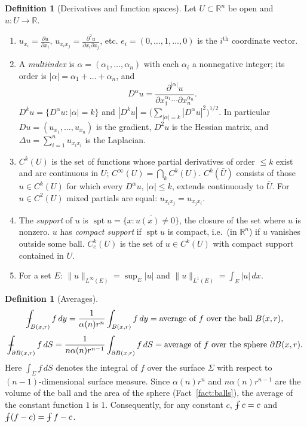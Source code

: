 \documentclass[11pt]{article}
\def\Xint#1{\mathchoice
  {\XXint\displaystyle\textstyle{#1}}%
  {\XXint\textstyle\scriptstyle{#1}}%
  {\XXint\scriptstyle\scriptscriptstyle{#1}}%
  {\XXint\scriptscriptstyle\scriptscriptstyle{#1}}%
  \!\int}
\def\XXint#1#2#3{{\setbox0=\hbox{$#1{#2#3}{\int}$}
  \vcenter{\hbox{$#2#3$}}\kern-.5\wd0}}
\def\fint{\Xint-}
\theoremstyle{plain}
\theoremstyle{definition}
\newtheorem{definition}[theorem]{Definition}
\theoremstyle{remark}
\begin{document}
\begin{definition}[Derivatives and function spaces]\label{def:derivatives}
Let $U \subset \mathbb{R}^n$ be open and $u : U \to \mathbb{R}$.
\begin{enumerate}
    \item $u_{x_i} = \frac{\partial u}{\partial x_i}$, $u_{x_i x_j} = \frac{\partial^2 u}{\partial x_i \partial x_j}$, etc. $e_i = (0,\dots,1,\dots,0)$ is the $i^{\text{th}}$ coordinate vector.
    \item A \emph{multiindex} is $\alpha = (\alpha_1, \dots, \alpha_n)$ with each $\alpha_i$ a nonnegative integer; its order is $|\alpha| = \alpha_1 + \dots + \alpha_n$, and
    $$ D^\alpha u = \frac{\partial^{|\alpha|} u}{\partial x_1^{\alpha_1} \cdots \partial x_n^{\alpha_n}}. $$
    $D^k u = \{ D^\alpha u : |\alpha| = k \}$ and $|D^k u| = \big( \sum_{|\alpha| = k} |D^\alpha u|^2 \big)^{1/2}$. In particular $Du = (u_{x_1}, \dots, u_{x_n})$ is the gradient, $D^2 u$ is the Hessian matrix, and $\Delta u = \sum_{i=1}^n u_{x_i x_i}$ is the Laplacian.
    \item $C^k(U)$ is the set of functions whose partial derivatives of order $\leq k$ exist and are continuous in $U$; $C^\infty(U) = \bigcap_k C^k(U)$. $C^k(\bar U)$ consists of those $u \in C^k(U)$ for which every $D^\alpha u$, $|\alpha| \le k$, extends continuously to $\bar U$. For $u \in C^2(U)$ mixed partials are equal: $u_{x_i x_j} = u_{x_j x_i}$.
    \item The \emph{support} of $u$ is $\operatorname{spt} u = \overline{\{ x : u(x) \neq 0 \}}$, the closure of the set where $u$ is nonzero. $u$ has \emph{compact support} if $\operatorname{spt} u$ is compact, i.e.\ (in $\mathbb{R}^n$) if $u$ vanishes outside some ball. $C_c^k(U)$ is the set of $u \in C^k(U)$ with compact support contained in $U$.
    \item For a set $E$: $\|u\|_{L^\infty(E)} = \sup_E |u|$ and $\|u\|_{L^1(E)} = \int_E |u|\, dx$.
\end{enumerate}
\end{definition}

\begin{definition}[Averages]\label{def:averages}
$$ \fint_{B(x,r)} f\, dy = \frac{1}{\alpha(n) r^n} \int_{B(x,r)} f\, dy = \text{average of } f \text{ over the ball } B(x,r), $$
$$ \fint_{\partial B(x,r)} f\, dS = \frac{1}{n\alpha(n) r^{n-1}} \int_{\partial B(x,r)} f\, dS = \text{average of } f \text{ over the sphere } \partial B(x,r). $$
Here $\int_\Sigma f\, dS$ denotes the integral of $f$ over the surface $\Sigma$ with respect to $(n-1)$-dimensional surface measure. Since $\alpha(n) r^n$ and $n\alpha(n) r^{n-1}$ are the volume of the ball and the area of the sphere (Fact~\ref{fact:balls}), the average of the constant function $1$ is $1$. Consequently, for any constant $c$, $\fint c = c$ and $\fint (f - c) = \fint f - c$.
\end{definition}
\end{document}
